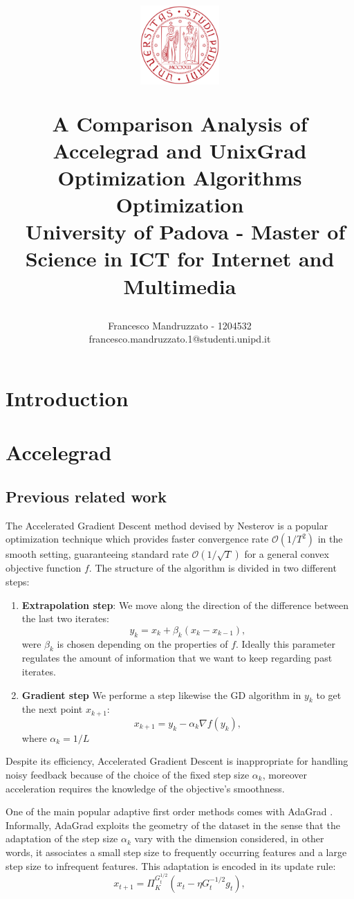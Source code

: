 \documentclass[12pt]{article}
\title{
\centerline{\includegraphics[width=30mm]{figures/unipd-logo.png}}
\vspace{0.2 cm}
A Comparison Analysis of Accelegrad and UnixGrad Optimization Algorithms \\
\vspace{0.3 cm}
Optimization
\large  \\
\
\small University of Padova - Master of Science in ICT for Internet and Multimedia
  }
\author{
    Francesco Mandruzzato - 1204532\\
    \small{francesco.mandruzzato.1@studenti.unipd.it}
}
\theoremstyle{definition}
\begin{document}
\maketitle

\section{Introduction}

\section{Accelegrad}

\subsection{Previous related work}

The Accelerated Gradient Descent method devised by Nesterov is a popular optimization technique which provides faster convergence rate $\mathcal{O}(1/T^2)$ in the smooth setting, guaranteeing standard rate $\mathcal{O}(1/\sqrt T)$ for a general convex objective function $f$. The structure of the algorithm is divided in two different steps:

\begin{enumerate}
  \item \textbf{Extrapolation step}: We move along the direction of the difference between the last two iterates:
  	  \begin{equation}
  			y_k = x_k + \beta_k(x_k - x_{k-1}),
	  \end{equation}
	  were $\beta_k$ is chosen depending on the properties of $f$. Ideally this parameter regulates the amount of information that we want to keep regarding past iterates.
  \item \textbf{Gradient step} We performe a step likewise the GD algorithm in $y_k$ to get the next point $x_{k+1}$:
  	  \begin{equation}
  			x_{k+1} = y_k - \alpha_k \nabla f(y_k),
	  \end{equation} 
	  where $\alpha_k = 1/L$ 
\end{enumerate}

Despite its efficiency, Accelerated Gradient Descent is inappropriate for handling noisy feedback because of the choice of the fixed step size $\alpha_k$, moreover acceleration requires the knowledge of the objective's smoothness.

One of the main popular adaptive first order methods comes with AdaGrad \cite{adagrad}. Informally, AdaGrad exploits the geometry of the dataset in the sense that the adaptation of the step size $\alpha_k$ vary with the dimension considered, in other words, it associates a small step size to frequently occurring features and a large step size to infrequent features. This adaptation is encoded in its update rule:
\begin{equation}
  x_{t+1} = \Pi_K^{G_t^{1/2}} (x_t - \eta G_t^{-1/2} g_t ),
\end{equation}
\end{document}
